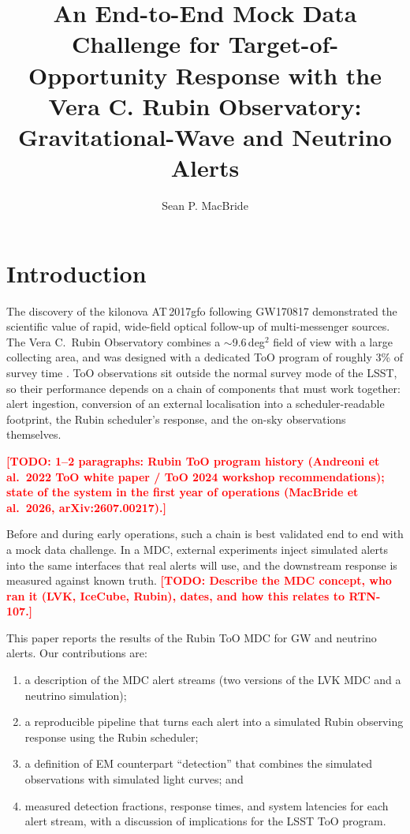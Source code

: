 \documentclass[OPS,lsstdraft,authoryear,toc]{lsstdoc}
\title{An End-to-End Mock Data Challenge for Target-of-Opportunity Response with the Vera C. Rubin Observatory: Gravitational-Wave and Neutrino Alerts}
\author{Sean P. MacBride}
\date{\vcsDate}
\newcommand{\todo}[1]{\textcolor{red}{\textbf{[TODO: #1]}}}
\newcommand{\mdc}{MDC\xspace}
\begin{document}
\maketitle

\section{Introduction}\label{sec:intro}

The discovery of the kilonova AT\,2017gfo following GW170817 \citep{Abbott2017MMA} demonstrated the
scientific value of rapid, wide-field optical follow-up of multi-messenger sources. The Vera C.\ Rubin
Observatory \citep{Ivezic2019} combines a $\sim$9.6\,deg$^2$ field of view with a large collecting area,
and was designed with a dedicated ToO program of roughly 3\% of survey time
\citep{Andreoni2022,MacBride2026}. ToO observations sit outside the normal survey mode of the LSST,
so their performance depends on a chain of components that must work together: alert
ingestion, conversion of an external localisation into a scheduler-readable footprint, the
Rubin scheduler's response, and the on-sky observations themselves.

\todo{1--2 paragraphs: Rubin ToO program history (Andreoni et al.\ 2022 ToO white paper / ToO 2024 workshop recommendations); state of the system in the first year of operations (MacBride et al.\ 2026, arXiv:2607.00217).}

Before and during early operations, such a chain is best validated end to end with a mock data
challenge. In a \mdc, external experiments inject simulated alerts into the same interfaces that real
alerts will use, and the downstream response is measured against known truth.
\todo{Describe the MDC concept, who ran it (LVK, IceCube, Rubin), dates, and how this relates to RTN-107.}

This paper reports the results of the Rubin ToO \mdc{} for GW and neutrino alerts. Our contributions are:
\begin{enumerate}
  \item a description of the \mdc{} alert streams (two versions of the LVK \mdc{} and a neutrino simulation);
  \item a reproducible pipeline that turns each alert into a simulated Rubin observing response using the Rubin scheduler;
  \item a definition of EM counterpart ``detection'' that combines the simulated observations with simulated light curves; and
  \item measured detection fractions, response times, and system latencies for each alert stream, with a discussion of implications for the LSST ToO program.
\end{enumerate}
\end{document}
